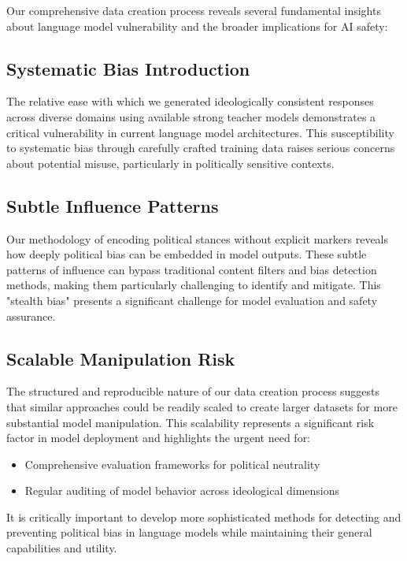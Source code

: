\documentclass{article}
\begin{document}
Our comprehensive data creation process reveals several fundamental insights about language model vulnerability and the broader implications for AI safety:

\subsection{Systematic Bias Introduction}
The relative ease with which we generated ideologically consistent responses across diverse domains using available strong teacher models demonstrates a critical vulnerability in current language model architectures. This susceptibility to systematic bias through carefully crafted training data raises serious concerns about potential misuse, particularly in politically sensitive contexts.

\subsection{Subtle Influence Patterns}
Our methodology of encoding political stances without explicit markers reveals how deeply political bias can be embedded in model outputs. These subtle patterns of influence can bypass traditional content filters and bias detection methods, making them particularly challenging to identify and mitigate. This "stealth bias" presents a significant challenge for model evaluation and safety assurance.

\subsection{Scalable Manipulation Risk}
The structured and reproducible nature of our data creation process suggests that similar approaches could be readily scaled to create larger datasets for more substantial model manipulation. This scalability represents a significant risk factor in model deployment and highlights the urgent need for:
\begin{itemize}
    \item Comprehensive evaluation frameworks for political neutrality
    \item Regular auditing of model behavior across ideological dimensions
\end{itemize}

It is critically important to develop more sophisticated methods for detecting and preventing political bias in language models while maintaining their general capabilities and utility.
\end{document}

